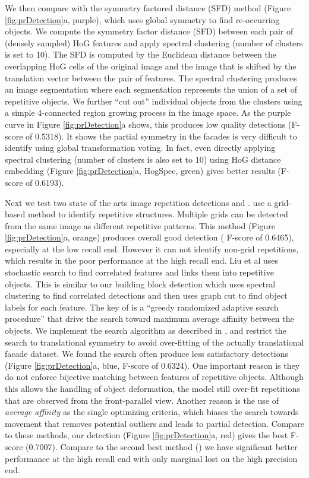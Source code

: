 \documentclass{acmtog}
\begin{document}
We then compare with the symmetry factored distance (SFD) method \cite{LIPMANsig2010} (Figure \ref{fig:prDetection}a, purple), which uses global symmetry to find re-occurring objects. We compute the symmetry factor distance (SFD) between each pair of (densely sampled) HoG features and apply spectral clustering (number of clusters is set to 10). The SFD is computed by the Euclidean distance between the overlapping HoG cells of the original image and the image that is shifted by the translation vector between the pair of features. The spectral clustering produces an image segmentation where each segmentation represents the union of a set of repetitive objects. We further ``cut out'' individual objects from the clusters using a simple 4-connected region growing process in the image space. As the purple curve in Figure \ref{fig:prDetection}a shows, this produces low quality detections (F-score of 0.5318). It shows the partial symmetry in the facades is very difficult to identify using global transformation voting. In fact, even directly applying spectral clustering (number of clusters is also set to 10) using HoG distance embedding (Figure \ref{fig:prDetection}a, HogSpec, green) gives better results (F-score of 0.6193).

Next we test two state of the arts image repetition detections \cite{Wu2010DL} and \cite{Liu2013GRASP}. \cite{Wu2010DL} use a grid-based method to identify repetitive structures. Multiple grids can be detected from the same image as different repetitive patterns. This method (Figure \ref{fig:prDetection}a, orange) produces overall good detection ( F-score of 0.6465), especially at the low recall end. However it can not identify non-grid repetitions, which results in the poor performance at the high recall end. Liu et al \cite{Liu2013GRASP} uses stochastic search to find correlated features and links them into repetitive objects. This is similar to our building block detection which uses spectral clustering to find correlated detections and then uses graph cut to find object labels for each feature. The key of \cite{Liu2013GRASP} is a ``greedy randomized adaptive search procedure'' that drive the search toward maximum average affinity between the objects. We implement the search algorithm as described in \cite{Liu2013GRASP}, and restrict the search to translational symmetry to avoid over-fitting of the actually translational facade dataset. We found the search often produce less satisfactory detections (Figure \ref{fig:prDetection}a, blue, F-score of 0.6324). One important reason is they do not enforce bijective matching between features of repetitive objects. Although this allows the handling of object deformation, the model still over-fit repetitions that are observed from the front-parallel view. Another reason is the use of \emph{average affinity} as the single optimizing criteria, which biases the search towards movement that removes potential outliers and leads to partial detection. Compare to these methods, our detection (Figure \ref{fig:prDetection}a, red) gives the best F-score (0.7007). Compare to the second best method (\cite{Wu2010DL}) we have significant better performance at the high recall end with only marginal lost on the high precision end. 
\end{document}
